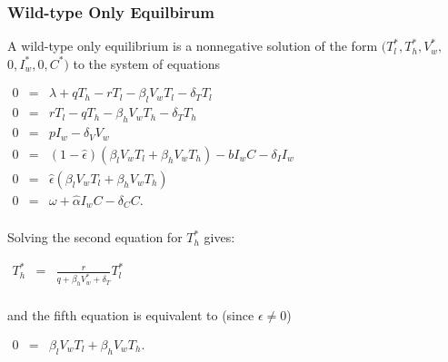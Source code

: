 \documentclass[11pt, oneside]{article}    %
\begin{document}
\subsubsection{Wild-type Only Equilbirum}

A wild-type only equilibrium is a nonnegative solution of the form $(T_l^*, T_h^*, V_w^*,$
$ 0,  I_w^*, 0, C^*)$ to the system of equations 

\vspace{5mm}

\begin{center}
$\begin{array}{rcl}
 0 & = &  \lambda + q T_h - r T_l  - {\beta_l} V_w T_l - \delta_T T_l \\
0 & = & r T_l - q T_h  -  \beta_h V_w T_h - \delta_T T_h\\
0 & = & p I_w - \delta_V V_w\\
0 & = & (1-\hat{\epsilon})(\beta_l V_w T_l + \beta_h V_w T_h) - b I_w C - \delta_I I_w\\
0 & = & \hat{\epsilon}(\beta_l V_w T_l + \beta_h V_w T_h) \\
0 & = & \omega + \hat{\alpha} I_w C - \delta_C C.\\
\end{array}$
\end{center}

\vspace{5mm}

Solving the second equation for $T_h^*$ gives:

\vspace{5mm}

\begin{center}
$\begin{array}{rcl}
 T_h^* & = &  \frac{r}{q+\beta_h V_w^*  + \delta_T} T_l^*\\
\end{array}$
\end{center}

\vspace{5mm}

and the fifth equation is equivalent to (since $\epsilon \neq 0$)

\vspace{5mm}

\begin{center}
$\begin{array}{rcl}
 0 & = & \beta_l V_w T_l + \beta_h V_w T_h.\\
\end{array}$
\end{center}
\end{document}
